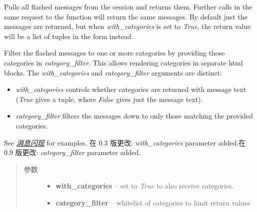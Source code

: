 \documentclass[a4paper,12pt]{sphinxmanual}
\begin{document}
\begin{fulllineitems}
\label{api:flask.get_flashed_messages}
Pulls all flashed messages from the session and returns them.
Further calls in the same request to the function will return
the same messages.  By default just the messages are returned,
but when \emph{with\_categories} is set to \emph{True}, the return value will
be a list of tuples in the form  instead.

Filter the flashed messages to one or more categories by providing those
categories in \emph{category\_filter}.  This allows rendering categories in
separate html blocks.  The \emph{with\_categories} and \emph{category\_filter}
arguments are distinct:
\begin{itemize}
\item {} 
\emph{with\_categories} controls whether categories are returned with message
text (\emph{True} gives a tuple, where \emph{False} gives just the message text).

\item {} 
\emph{category\_filter} filters the messages down to only those matching the
provided categories.

\end{itemize}

See {\hyperref[patterns/flashing:message-flashing-pattern]{\emph{消息闪现}}} for examples.
在 0.3 版更改: \emph{with\_categories} parameter added.在 0.9 版更改: \emph{category\_filter} parameter added.\begin{quote}\begin{description}
\item[{参数}] \leavevmode\begin{itemize}
\item {} 
\textbf{with\_categories} -- set to \emph{True} to also receive categories.

\item {} 
\textbf{category\_filter} -- whitelist of categories to limit return values

\end{itemize}

\end{description}\end{quote}

\end{fulllineitems}
\end{document}
